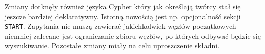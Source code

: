 \documentclass[brudnopis]{xmgr}
\begin{document}
Zmiany dotknęły również języka Cypher który jak określają twórcy stał się jeszcze bardziej deklaratywny. Istotną nowością jest np. opcjonalność sekcji \texttt{START}. Zapytania nie muszą zawierać jakichkolwiek węzłów początkowych niemniej zalecane jest ograniczanie zbioru węzłów, po których odbywać będzie się wyszukiwanie. Pozostałe zmiany miały na celu uproszczenie składni.

\nocite{*}



\listoftables

\listoffigures

\oswiadczenie
\end{document}
